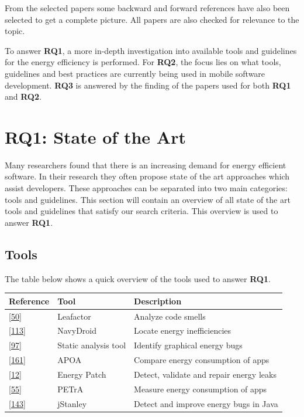 \documentclass[]{book}
\begin{document}
From the selected papers some backward and forward references have also
been selected to get a complete picture. All papers are also checked for
relevance to the topic.

To answer \textbf{RQ1}, a more in-depth investigation into available
tools and guidelines for the energy efficiency is performed. For
\textbf{RQ2}, the focus lies on what tools, guidelines and best
practices are currently being used in mobile software development.
\textbf{RQ3} is answered by the finding of the papers used for both
\textbf{RQ1} and \textbf{RQ2}.

\section{RQ1: State of the Art}\label{rq1-state-of-the-art}

Many researchers found that there is an increasing demand for energy
efficient software. In their research they often propose state of the
art approaches which assist developers. These approaches can be
separated into two main categories: tools and guidelines. This section
will contain an overview of all state of the art tools and guidelines
that satisfy our search criteria. This overview is used to answer
\textbf{RQ1}.

\subsection{Tools}\label{tools}

The table below shows a quick overview of the tools used to answer
\textbf{RQ1}.

\begin{longtable}[]{@{}lll@{}}
\toprule
Reference & Tool & Description\tabularnewline
\midrule
\endhead
{[}\protect\hyperlink{ref-CA2018}{50}{]} & Leafactor & Analyze code
smells\tabularnewline
{[}\protect\hyperlink{ref-LWXM2017}{113}{]} & NavyDroid & Locate energy
inefficiencies\tabularnewline
{[}\protect\hyperlink{ref-KKK2016}{97}{]} & Static analysis tool &
Identify graphical energy bugs\tabularnewline
{[}\protect\hyperlink{ref-SKHA2018}{161}{]} & APOA & Compare energy
consumption of apps\tabularnewline
{[}\protect\hyperlink{ref-BCBR2017}{12}{]} & Energy Patch & Detect,
validate and repair energy leaks\tabularnewline
{[}\protect\hyperlink{ref-NPPPZL2017B}{55}{]} & PETrA & Measure energy
consumption of apps\tabularnewline
{[}\protect\hyperlink{ref-PSCS2018}{143}{]} & jStanley & Detect and
improve energy bugs in Java\tabularnewline
\bottomrule
\end{longtable}
\end{document}
